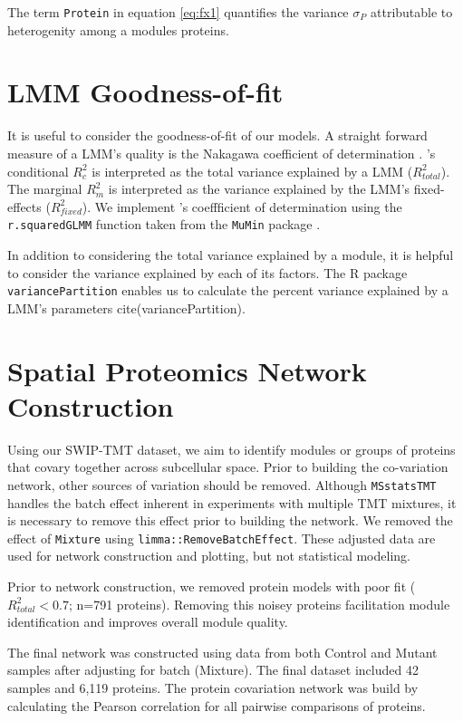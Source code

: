 \documentclass[11pt]{elife}\usepackage[]{graphicx}\usepackage[]{color}
\begin{document}
The term \texttt{Protein} in equation \ref{eq:fx1} quantifies the variance
$\sigma_P$ attributable to heterogenity among a modules proteins.


\section{LMM Goodness-of-fit}

It is useful to consider the goodness-of-fit of our models. A straight forward
measure of a LMM's quality is the Nakagawa coefficient of 
determination \citep{Nakagawa2012}. \cite{Nakagawa2012}'s conditional $R^2_c$ is 
interpreted as the total variance explained by a LMM ($R^2_{total}$).
The marginal $R^2_m$ is interpreted as the variance explained by the LMM's 
fixed-effects ($R^2_{fixed}$). We implement \cite{Nakagawa2012}'s coeffficient of 
determination using the \texttt{r.squaredGLMM} function taken from the 
\texttt{MuMin} package \citep{WangMerkle2018}. 

In addition to considering the total variance explained by a module, it is
helpful to consider the variance explained by each of its factors.
The R package \texttt{variancePartition} enables us to
calculate the percent variance explained by a LMM's parameters
cite(variancePartition). 


\section{Spatial Proteomics Network Construction}

Using our SWIP-TMT dataset, we aim to identify modules or groups of
proteins that covary together across subcellular space. Prior to building the
co-variation network, other sources of variation should be removed. Although
\texttt{MSstatsTMT} handles the batch effect inherent in experiments with
multiple TMT mixtures, it is necessary to remove this effect prior to building
the network. We removed the effect of \texttt{Mixture} using
\texttt{limma::RemoveBatchEffect}. These adjusted data are used for network
construction and plotting, but not statistical modeling.

Prior to network construction, we removed protein models with poor fit 
($R^2_{total}<0.7$; n=791 proteins). Removing this noisey proteins facilitation
module identification and improves overall module quality.

The final network was constructed using data from both Control and Mutant 
samples after adjusting for batch (Mixture). The final dataset included 
42 samples and 6,119 proteins. The protein covariation network was build by
calculating the Pearson correlation for all pairwise comparisons of proteins.
\end{document}
